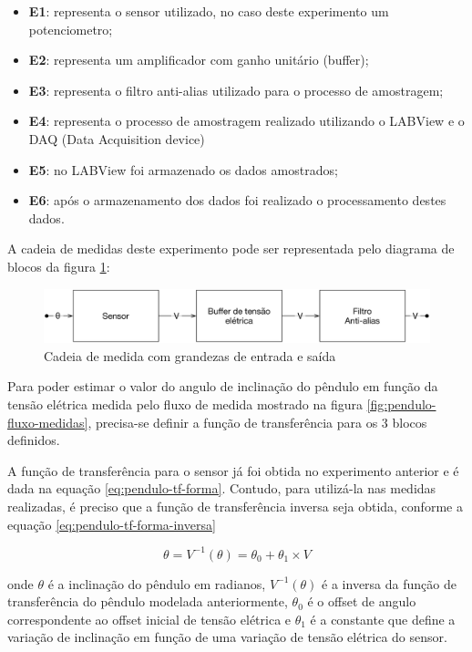 \documentclass[12pt,a4paper]{instrumentacao}
\begin{document}
\begin{itemize}
	\item \textbf{E1}: representa o sensor utilizado, no caso deste experimento um potenciometro;
	\item \textbf{E2}: representa um amplificador com ganho unitário (buffer);
	\item \textbf{E3}: representa o filtro anti-alias utilizado para o processo de amostragem;
	\item \textbf{E4}: representa o processo de amostragem realizado utilizando o LABView e o DAQ (Data Acquisition device)
	\item \textbf{E5}: no LABView foi armazenado os dados amostrados;
	\item \textbf{E6}: após o armazenamento dos dados foi realizado o processamento destes dados.
\end{itemize}

A cadeia de medidas deste experimento pode ser representada pelo diagrama de blocos da figura \ref{fig:pendulo-cadeia-medidas}:

\begin{figure}[H]
\centering
\includegraphics[width=\textwidth]{Cadeia de medida.pdf}
\caption{Cadeia de medida com grandezas de entrada e saída}
\label{fig:pendulo-cadeia-medidas}
\end{figure}

Para poder estimar o valor do angulo de inclinação do pêndulo em função da tensão elétrica medida pelo fluxo de medida mostrado na figura \ref{fig:pendulo-fluxo-medidas}, precisa-se definir a função de transferência para os 3 blocos definidos.

A função de transferência para o sensor já foi obtida no experimento anterior e é dada na equação \ref{eq:pendulo-tf-forma}. Contudo, para utilizá-la nas medidas realizadas, é preciso que a função de transferência inversa seja obtida, conforme a equação \ref{eq:pendulo-tf-forma-inversa}

\begin{equation}
	\theta = V^{-1}(\theta) = \theta_0 + \theta_1 \times V
	\label{eq:pendulo-tf-forma-inversa}
\end{equation}

onde $\theta$ é a inclinação do pêndulo em radianos, $V^{-1}(\theta)$ é a inversa da função de transferência do pêndulo modelada anteriormente, $\theta_0$ é o offset de angulo correspondente ao offset inicial de tensão elétrica e $\theta_1$ é a constante que define a variação de inclinação em função de uma variação de tensão elétrica do sensor.
\end{document}
